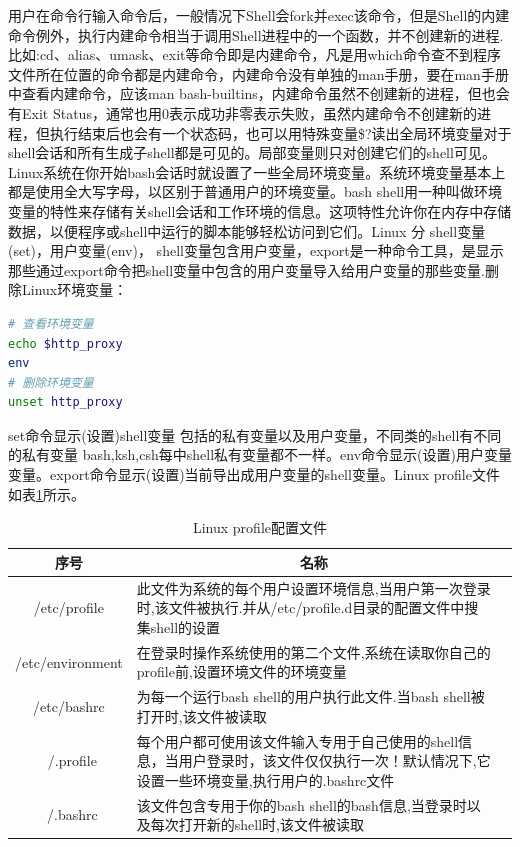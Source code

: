 \documentclass[12pt]{book}
\numberwithin{dummy}{section}
\theoremstyle{ocrenumbox}
\theoremstyle{blacknumex}
\theoremstyle{blacknumbox}
\theoremstyle{ocrenum}
\begin{document}
用户在命令行输入命令后，一般情况下Shell会fork并exec该命令，但是Shell的内建命令例外，执行内建命令相当于调用Shell进程中的一个函数，并不创建新的进程.
比如:cd、alias、umask、exit等命令即是内建命令，凡是用which命令查不到程序文件所在位置的命令都是内建命令，内建命令没有单独的man手册，要在man手册中查看内建命令，应该man bash-builtins，内建命令虽然不创建新的进程，但也会有Exit Status，通常也用0表示成功非零表示失败，虽然内建命令不创建新的进程，但执行结束后也会有一个状态码，也可以用特殊变量\$?读出全局环境变量对于shell会话和所有生成子shell都是可见的。局部变量则只对创建它们的shell可见。Linux系统在你开始bash会话时就设置了一些全局环境变量。系统环境变量基本上都是使用全大写字母，以区别于普通用户的环境变量。bash shell用一种叫做环境变量的特性来存储有关shell会话和工作环境的信息。这项特性允许你在内存中存储数据，以便程序或shell中运行的脚本能够轻松访问到它们。Linux 分 shell变量(set)，用户变量(env)， shell变量包含用户变量，export是一种命令工具，是显示那些通过export命令把shell变量中包含的用户变量导入给用户变量的那些变量.删除Linux环境变量：

\begin{lstlisting}[language=Bash]
# 查看环境变量
echo $http_proxy
env
# 删除环境变量
unset http_proxy
\end{lstlisting}

set命令显示(设置)shell变量 包括的私有变量以及用户变量，不同类的shell有不同的私有变量 bash,ksh,csh每中shell私有变量都不一样。env命令显示(设置)用户变量变量。export命令显示(设置)当前导出成用户变量的shell变量。Linux profile文件如表\ref{table:linuxconfigfile}所示。

\begin{table}
	\caption{Linux profile配置文件}
	\label{table:linuxconfigfile}
	\begin{center}
	\begin{tabular}{cp{10cm}c}
		\hline
		\multirow{1}{*}{序号}
		& \multicolumn{1}{c}{名称}  \\
		\hline			
		/etc/profile  & 此文件为系统的每个用户设置环境信息,当用户第一次登录时,该文件被执行.并从/etc/profile.d目录的配置文件中搜集shell的设置 \\
		\hline	
		/etc/environment & 在登录时操作系统使用的第二个文件,系统在读取你自己的profile前,设置环境文件的环境变量 \\
		\hline
		/etc/bashrc & 为每一个运行bash shell的用户执行此文件.当bash shell被打开时,该文件被读取\\
		\hline
		~/.profile & 每个用户都可使用该文件输入专用于自己使用的shell信息，当用户登录时，该文件仅仅执行一次！默认情况下,它设置一些环境变量,执行用户的.bashrc文件\\
		\hline
		~/.bashrc &  该文件包含专用于你的bash shell的bash信息,当登录时以及每次打开新的shell时,该文件被读取\\
		\hline
	\end{tabular}	
	\end{center}
\end{table}
\end{document}
